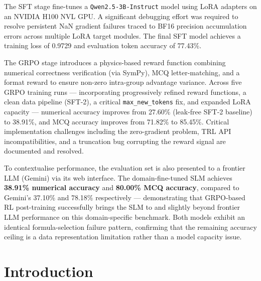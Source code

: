 \documentclass[12pt]{report}
\begin{document}
The SFT stage fine-tunes a \texttt{Qwen2.5-3B-Instruct} model using LoRA adapters on an NVIDIA H100 NVL GPU. A significant debugging effort was required to resolve persistent NaN gradient failures traced to BF16 precision accumulation errors across multiple LoRA target modules. The final SFT model achieves a training loss of 0.9729 and evaluation token accuracy of 77.43\%.

The GRPO stage introduces a physics-based reward function combining numerical correctness verification (via SymPy), MCQ letter-matching, and a format reward to ensure non-zero intra-group advantage variance. Across five GRPO training runs --- incorporating progressively refined reward functions, a clean data pipeline (SFT-2), a critical \texttt{max\_new\_tokens} fix, and expanded LoRA capacity --- numerical accuracy improves from 27.60\% (leak-free SFT-2 baseline) to 38.91\%, and MCQ accuracy improves from 71.82\% to 85.45\%. Critical implementation challenges including the zero-gradient problem, TRL API incompatibilities, and a truncation bug corrupting the reward signal are documented and resolved.

To contextualise performance, the evaluation set is also presented to a frontier LLM (Gemini) via its web interface. The domain-fine-tuned SLM achieves \textbf{38.91\% numerical accuracy} and \textbf{80.00\% MCQ accuracy}, compared to Gemini's 37.10\% and 78.18\% respectively --- demonstrating that GRPO-based RL post-training successfully brings the SLM to and slightly beyond frontier LLM performance on this domain-specific benchmark. Both models exhibit an identical formula-selection failure pattern, confirming that the remaining accuracy ceiling is a data representation limitation rather than a model capacity issue.

\tableofcontents
\listoffigures
\listoftables

\clearpage
{}


\chapter{Introduction}
\end{document}
